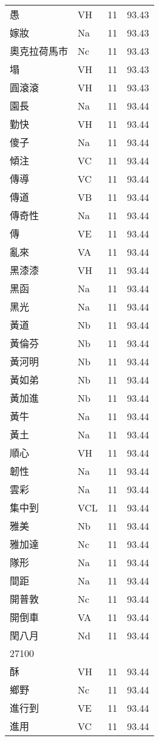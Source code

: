 \documentclass[twocolumn]{book}
\begin{document}
\begin{supertabular}{llrr}
愚 & VH & 11 &  93.43\\
嫁妝 & Na & 11 &  93.43\\
奧克拉荷馬市 & Nc & 11 &  93.43\\
塌 & VH & 11 &  93.43\\
圓滾滾 & VH & 11 &  93.43\\
園長 & Na & 11 &  93.44\\
勤快 & VH & 11 &  93.44\\
傻子 & Na & 11 &  93.44\\
傾注 & VC & 11 &  93.44\\
傳導 & VC & 11 &  93.44\\
傳道 & VB & 11 &  93.44\\
傳奇性 & Na & 11 &  93.44\\
傳 & VE & 11 &  93.44\\
亂來 & VA & 11 &  93.44\\
黑漆漆 & VH & 11 &  93.44\\
黑函 & Na & 11 &  93.44\\
黑光 & Na & 11 &  93.44\\
黃道 & Nb & 11 &  93.44\\
黃倫芬 & Nb & 11 &  93.44\\
黃河明 & Nb & 11 &  93.44\\
黃如弟 & Nb & 11 &  93.44\\
黃加進 & Nb & 11 &  93.44\\
黃牛 & Na & 11 &  93.44\\
黃土 & Na & 11 &  93.44\\
順心 & VH & 11 &  93.44\\
韌性 & Na & 11 &  93.44\\
雲彩 & Na & 11 &  93.44\\
集中到 & VCL & 11 &  93.44\\
雅美 & Nb & 11 &  93.44\\
雅加達 & Nc & 11 &  93.44\\
隊形 & Na & 11 &  93.44\\
間距 & Na & 11 &  93.44\\
開普敦 & Nc & 11 &  93.44\\
開倒車 & VA & 11 &  93.44\\
閏八月 & Nd & 11 &  93.44\\
27100\\
酥 & VH & 11 &  93.44\\
鄉野 & Nc & 11 &  93.44\\
進行到 & VE & 11 &  93.44\\
進用 & VC & 11 &  93.44\\

\end{supertabular}
\end{document}
